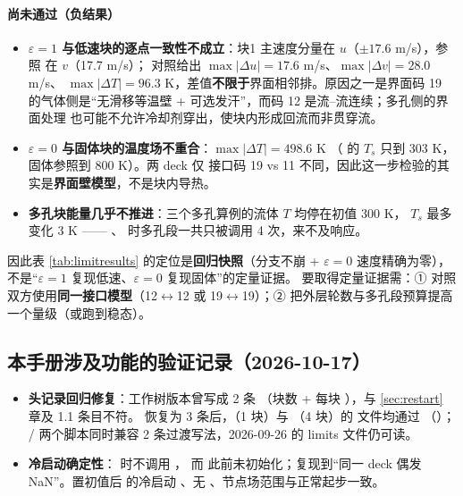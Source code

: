 \paragraph{尚未通过（负结果）}
\begin{itemize}
  \item \textbf{$\varepsilon=1$ 与低速块的逐点一致性不成立}：块1 主速度分量在
        $u$（$\pm17.6$ m/s），参照  在 $v$（17.7 m/s）；
         对照给出 $\max|\Delta u|=17.6$ m/s、$\max|\Delta v|=28.0$ m/s、
        $\max|\Delta T|=96.3$ K，差值\textbf{不限于}界面相邻排。原因之一是界面码 19
        的气体侧是“无滑移等温壁 + 可选发汗”，而码 12 是流--流连续；多孔侧的界面处理
        也可能不允许冷却剂穿出，使块内形成回流而非贯穿流。
  \item \textbf{$\varepsilon=0$ 与固体块的温度场不重合}：$\max|\Delta T|=498.6$ K
        （ 的 $T_s$ 只到 303 K，固体参照到 800 K）。两 deck 仅
        接口码 19 vs 11 不同，因此这一步检验的其实是\textbf{界面壁模型}，不是块内导热。
  \item \textbf{多孔块能量几乎不推进}：三个多孔算例的流体 $T$ 均停在初值 300 K，
        $T_s$ 最多变化 3 K —— 、
        时多孔段一共只被调用 4 次，来不及响应。
\end{itemize}

\noindent 因此表 \ref{tab:limitresults} 的定位是\textbf{回归快照}（分支不崩 + $\varepsilon=0$
速度精确为零），不是“$\varepsilon=1$ 复现低速、$\varepsilon=0$ 复现固体”的定量证据。
要取得定量证据需：① 对照双方使用\textbf{同一接口模型}（12$\leftrightarrow$12 或
19$\leftrightarrow$19）；② 把外层轮数与多孔段预算提高一个量级（或跑到稳态）。

\subsection{本手册涉及功能的验证记录（2026-10-17）}
\begin{itemize}
  \item \textbf{ 头记录回归修复}：工作树版本曾写成 2 条
        （块数 + 每块 ），与 \ref{sec:restart} 章及 1.1 条目不符。
        恢复为 3 条后，（1 块）与 （4 块）的
        文件均通过 （）；
        / 两个脚本同时兼容 2 条过渡写法，2026-09-26 的
        limits 文件仍可读。
  \item \textbf{冷启动确定性}： 时不调用 ，
        而  此前未初始化；复现到“同一 deck 偶发 NaN”。置初值后
         的冷启动 、无 、节点场范围与正常起步一致。
\end{itemize}

